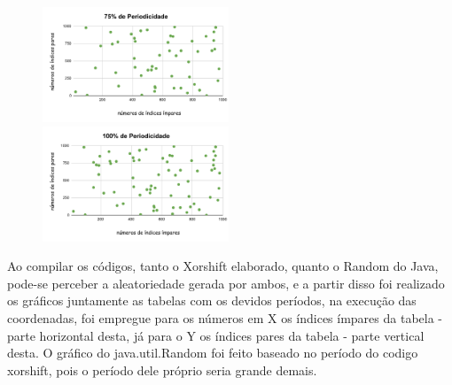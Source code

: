           \begin{figure}[H] 
            \centering
                \includegraphics[width=0.496\textwidth]{75PeriodicidadeJ.pdf}
                \includegraphics[width=0.496\textwidth]{100PeriodicidadeJ.pdf}    
                \label{fig:Desempenho}
        \end{figure}
        
Ao compilar os códigos, tanto o Xorshift elaborado,  quanto o Random do Java, pode-se perceber a aleatoriedade gerada por ambos, e a partir disso foi realizado os gráficos juntamente as tabelas com os devidos períodos, na execução das coordenadas,  foi empregue para os números em X os índices  ímpares da tabela - parte horizontal desta,  já para o Y os  índices pares da tabela - parte vertical desta. O gráfico do java.util.Random foi feito baseado no período do codigo xorshift, pois o período dele próprio seria grande demais.